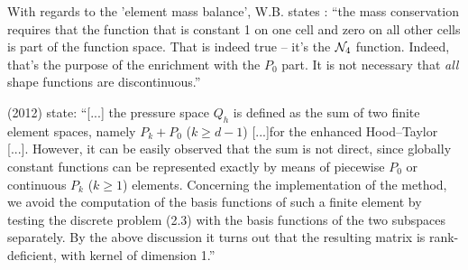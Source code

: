 With regards to the 'element mass balance', W.B. states : 
``the mass conservation requires that the function that is constant 1 
on one cell and zero on all other cells is part of the function space. 
That is indeed true -- it's the ${\mathcal{N}}_4$ function. Indeed, that's the purpose of 
the enrichment with the $P_0$ part. It is not necessary that {\it all} shape functions are discontinuous.''





\textcite{bocg12} (2012) state: ``[...] the pressure space $Q_h$ is defined as the sum of two finite 
element spaces, namely $P_k+P_0$ ($k \ge d- 1$) [...]for the enhanced Hood–Taylor [...]. 
However, it can be easily observed that the sum is not direct, 
since globally constant functions can be represented exactly by means of piecewise 
$P_0$ or continuous $P_k$ ($k \ge 1$) elements.
Concerning the implementation of the method, we avoid the computation of the basis
functions of such a finite element by testing the discrete problem (2.3) with the basis 
functions of the two subspaces separately. By the above discussion it turns out that the resulting
matrix is rank-deficient, with kernel of dimension 1.''




